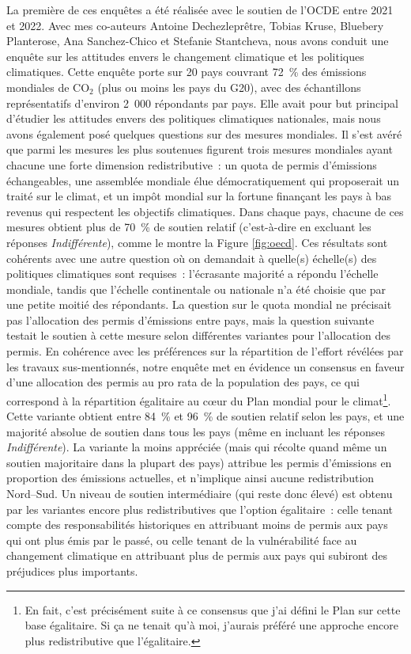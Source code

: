\documentclass[a5paper,french]{memoir}
\begin{document}
La première de ces enquêtes a été réalisée avec le soutien de l'OCDE entre 2021 et 2022. Avec mes co-auteurs Antoine Dechezleprêtre, Tobias Kruse, Bluebery Planterose, Ana Sanchez-Chico et Stefanie Stantcheva, nous avons conduit une enquête sur les attitudes envers le changement climatique et les politiques climatiques. Cette enquête porte sur 20 pays couvrant 72~\% des émissions mondiales de CO$_\text{2}$ (plus ou moins les pays du G20), avec des échantillons représentatifs d'environ 2~000 répondants par pays. Elle avait pour but principal d'étudier les attitudes envers des politiques climatiques nationales, mais nous avons également posé quelques questions sur des mesures mondiales. Il s'est avéré que parmi les mesures les plus soutenues figurent trois mesures mondiales ayant chacune une forte dimension redistributive~: un quota de permis d'émissions échangeables, une assemblée mondiale élue démocratiquement qui proposerait un traité sur le climat, et un impôt mondial sur la fortune finançant les pays à bas revenus qui respectent les objectifs climatiques. Dans chaque pays, chacune de ces mesures obtient plus de 70~\% de soutien relatif (c'est-à-dire en excluant les réponses \textit{Indifférent\textperiodcentered{}e}), comme le montre la Figure \ref{fig:oecd}. Ces résultats sont cohérents avec une autre question où on demandait à quelle(s) échelle(s) des politiques climatiques sont requises~: l'écrasante majorité a répondu l'échelle mondiale, tandis que l'échelle continentale ou nationale n'a été choisie que par une petite moitié des répondants. La question sur le quota mondial ne précisait pas l'allocation des permis d'émissions entre pays, mais la question suivante testait le soutien à cette mesure selon différentes variantes pour l'allocation des permis. En cohérence avec les préférences sur la répartition de l'effort révélées par les travaux sus-mentionnés, notre enquête met en évidence un consensus en faveur d'une allocation des permis au pro rata de la population des pays, ce qui correspond à la répartition égalitaire au cœur du Plan mondial pour le climat\footnote{En fait, c'est précisément suite à ce consensus que j'ai défini le Plan sur cette base égalitaire. Si ça ne tenait qu'à moi, j'aurais préféré une approche encore plus redistributive que l'égalitaire.}. Cette variante obtient entre 84~\% et 96~\% de soutien relatif selon les pays, et une majorité absolue de soutien dans tous les pays (même en incluant les réponses \textit{Indifférent\textperiodcentered{}e}). La variante la moins appréciée (mais qui récolte quand même un soutien majoritaire dans la plupart des pays) attribue les permis d'émissions en proportion des émissions actuelles, et n'implique ainsi aucune redistribution Nord--Sud. Un niveau de soutien intermédiaire (qui reste donc élevé) est obtenu par les variantes encore plus redistributives que l'option égalitaire~: celle tenant compte des responsabilités historiques en attribuant moins de permis aux pays qui ont plus émis par le passé, ou celle tenant de la vulnérabilité face au changement climatique en attribuant plus de permis aux pays qui subiront des préjudices plus importants. 
\end{document}
